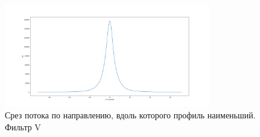 \documentclass [12pt, a4paper] {article}
\theoremstyle{definition}
\begin{document}
		\begin{figure}
		\centering
			\includegraphics[width = 0.8\textwidth]{V_slice_max.png}
			\caption{Срез потока по направлению, вдоль которого профиль наименьший. Фильтр V}
\end{figure}
\end{document}

